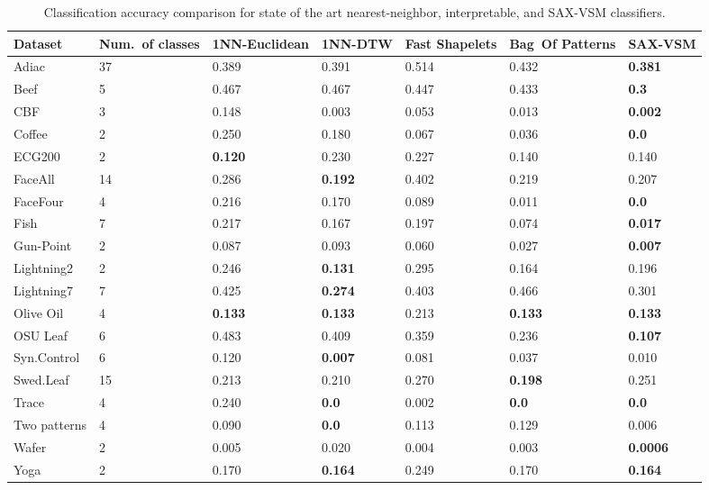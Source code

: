 \begin{table}[t!]
\captionsetup{justification=centering}
\caption{Classification accuracy comparison for state of the art nearest-neighbor, interpretable, and \mbox{SAX-VSM} classifiers.}
 \label{perf_table1}
{\setlength{\extrarowheight}{1.5pt}%
{\footnotesize
\begin{tabularx}{\linewidth}{@{} l *6X @{}}
\hline
Dataset & \mbox{Num. of} classes & 1NN-Euclidean & 1NN-DTW & Fast Shapelets &  \mbox{Bag Of} \mbox{Patterns}
& SAX-VSM\\
\hline
Adiac        &37  & 0.389   & 0.391  & 0.514  & 0.432  & \textbf{0.381}\\
Beef         &5   & 0.467   & 0.467  & 0.447  & 0.433 & \textbf{0.3}\\
CBF         & 3  & 0.148    & 0.003  & 0.053    & 0.013 & \textbf{0.002} \\
Coffee       &2    & 0.250   & 0.180  & 0.067     & 0.036     & \textbf{0.0} \\
ECG200     &2   & \textbf{0.120}  & 0.230  & 0.227     & 0.140   & 0.140 \\
FaceAll      &14  & 0.286   & \textbf{0.192}  & 0.402     & 0.219   & 0.207\\
FaceFour    &4   & 0.216   & 0.170  & 0.089     & 0.011   & \textbf{0.0} \\
Fish         &7   & 0.217   & 0.167  & 0.197    & 0.074   & \textbf{0.017} \\
Gun-Point    &2   & 0.087   & 0.093  & 0.060     & 0.027     & \textbf{0.007} \\
Lightning2    &2   & 0.246   & \textbf{0.131}  & 0.295  & 0.164  & 0.196 \\
Lightning7    &7   & 0.425   & \textbf{0.274}  & 0.403  & 0.466  & 0.301 \\
Olive Oil     &4   & \textbf{0.133}   & \textbf{0.133}  & 0.213     & \textbf{0.133}  & \textbf{0.133}\\
OSU Leaf    &6   & 0.483   & 0.409  & 0.359     & 0.236  & \textbf{0.107} \\
Syn.Control  &6   & 0.120   & \textbf{0.007}  & 0.081     & 0.037  & 0.010 \\
Swed.Leaf   &15  & 0.213   & 0.210 & 0.270 & \textbf{0.198} & 0.251 \\
Trace       &4   & 0.240   & \textbf{0.0}    & 0.002  & \textbf{0.0} & \textbf{0.0} \\
Two patterns &4   & 0.090   & \textbf{0.0}    & 0.113   & 0.129      & 0.006 \\
Wafer        &2    & 0.005   & 0.020     & 0.004  & 0.003 & \textbf{0.0006} \\
Yoga        &2    & 0.170   & \textbf{0.164}  & 0.249 & 0.170 & \textbf{0.164} \\
\hline
\end{tabularx}
}}
\end{table}

